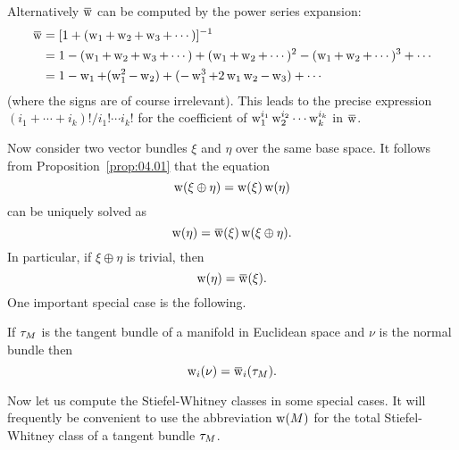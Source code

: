 \documentclass[../main]{subfiles}
\begin{document}
Alternatively $\xoverline{\sw}$ can be computed by the power series expansion:
\begin{align*}
\xoverline{\sw} &=[1+(\sw_{1}+\sw_{2}+\sw_{3}+\cdots)]^{-1} \\
&=1-(\sw_{1}+\sw_{2}+\sw_{3}+\cdots)+(\sw_{1}+\sw_{2}+\cdots)^{2}-(\sw_{1}+\sw_{2}+\cdots)^{3}+\cdots \\
&=1-\sw_{1}+(\sw_{1}^{2}-\sw_{2})+(-\sw_{1}^{3}+2\sw_{1}\sw_{2}-\sw_3)+\cdots
\end{align*}
(where the signs are of course irrelevant). This leads to the precise expression $(i_{1}+\cdots+i_{k}) ! / i_{1} ! \cdots i_{k} !$ for the coefficient of $\operatorname{w}_{1}^{i_1}\operatorname{w}_{2}^{i_{2}} \cdots \operatorname{w}_{k}^{i_k}$ in $\xoverline{\sw}$.

Now consider two vector bundles $\xi$ and $\eta$ over the same base space. It follows from Proposition~\ref{prop:04.01} that the equation
\[
\operatorname{w}(\xi \oplus \eta)=\operatorname{w}(\xi) \operatorname{w}(\eta)
\]
can be uniquely solved as
\[
\sw(\eta)=\xoverline{\sw}(\xi) \sw(\xi \oplus \eta) .
\]
In particular, if $\xi \oplus \eta$ is trivial, then
\[
\sw(\eta)=\xoverline{\sw}(\xi).
\]
One important special case is the following.

\begin{lemma}
\label{lem:04.02}
If $\tau_{M}$ is the tangent bundle
 of a manifold in Euclidean space and $\nu$ is the normal bundle then
\[
\sw_{i}(\nu)=\xoverline{\sw}_{i}(\tangentBundle{M}).
\]
\end{lemma}

Now let us compute the Stiefel-Whitney classes in some special cases. It will frequently be convenient to use the abbreviation $\operatorname{w}(M)$ for the total Stiefel\nobreakdash-Whitney class of a tangent bundle $\tau_{M}$.
\end{document}
